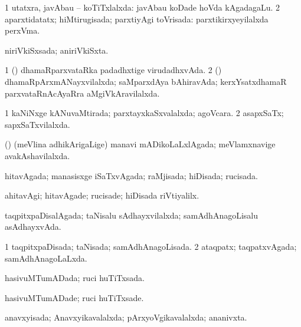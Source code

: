 \bentry
{} 
\gl{\gu}
\expl{}
\bmng
\bnum
\num{1} utatxra, javAbau -- koTiTxlalxda:  javAbau koDade hoVda kAgadagaLu. 
\num{2} aparxtidatatx; hiMtirugisada; parxtiyAgi toVrisada:  parxtikirxyeyilalxda perxVma. 
\enum
\emng
\eentry

\bentry
{} 
\gl{\gu}
\expl{}
\bmng
niriVkiSxsada; aniriVkiSxta. 
\emng
\eentry

\bentry
{} 
\gl{\gu}
\expl{}
\bmng
\bnum
\num{1} (\kerxY) dhamaRparxvataRka padadhxtige virudadhxvAda. 
\num{2} (\kerxY) dhamaRpArxmANayxvilalxda; saMparxdAya bAhiravAda; kerxYsatxdhamaR parxvataRnAcAyaRra aMgiVkAravilalxda. 
\enum
\emng
\eentry

\bentry
{} 
\gl{\gu}
\expl{}
\bmng
\bnum
\num{1} kaNiNxge kANuvaMtirada; parxtayxkaSxvalalxda; agoVcara. 
\num{2} asapxSaTx; sapxSaTxvilalxda. 
\enum
\emng
\eentry

\bentry
{} 
\gl{\gu}
\expl{}
\bmng
(\nAyxshA) (meVlina adhikArigaLige) manavi mADikoLaLxlAgada; meVlamxnavige avakAshavilalxda. 
\emng
\eentry

\bentry
{} 
\gl{\gu}
\expl{}
\bmng
hitavAgada; manasisxge iSaTxvAgada; raMjisada; hiDisada; rucisada. 
\emng
\eentry

\bentry
{} 
\gl{\kirxvi}
\expl{}
\bmng
ahitavAgi; hitavAgade; rucisade; hiDisada riVtiyalilx. 
\emng
\eentry

\bentry
{} 
\gl{\gu}
\expl{}
\bmng
taqpitxpaDisalAgada; taNisalu sAdhayxvilalxda; samAdhAnagoLisalu asAdhayxvAda. 
\emng
\eentry

\bentry
{} 
\gl{\gu}
\expl{}
\bmng
\bnum
\num{1} taqpitxpaDisada; taNisada; samAdhAnagoLisada. 
\num{2} ataqpatx; taqpatxvAgada; samAdhAnagoLaLxda. 
\enum
\emng
\eentry

\bentry
{} 
\gl{\gu}
\expl{}
\bmng
hasivuMTumADada; ruci huTiTxsada. 
\emng
\eentry

\bentry
{} 
\gl{\kirxvi}
\expl{}
\bmng
hasivuMTumADade; ruci huTiTxsade. 
\emng
\eentry

\bentry
{} 
\gl{\gu}
\expl{}
\bmng
anavxyisada; Anavxyikavalalxda; pArxyoVgikavalalxda; ananivxta. 
\emng
\eentry

